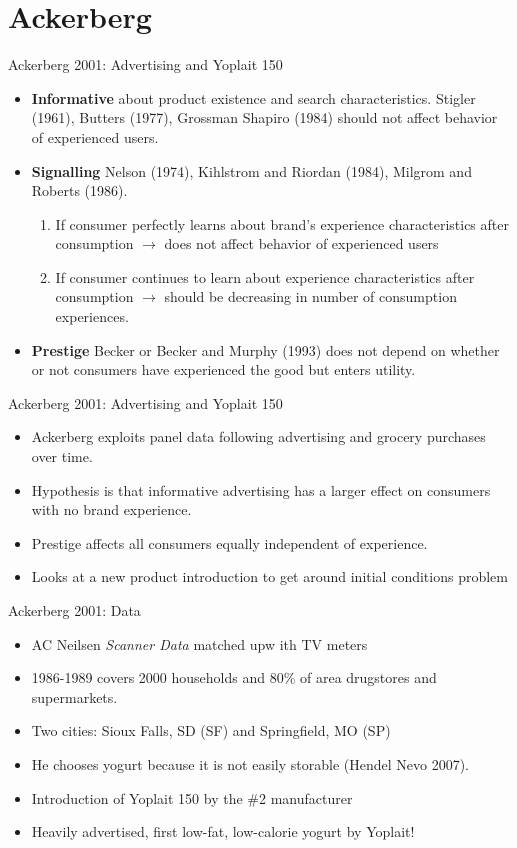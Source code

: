 \documentclass[aspectratio=169,11pt]{beamer}
\begin{document}
\section*{Ackerberg}
\begin{frame}{Ackerberg 2001: Advertising and Yoplait 150}
\begin{itemize}
\item \textbf{Informative} about product existence and search characteristics. Stigler (1961), Butters (1977), Grossman Shapiro (1984) should not affect behavior of experienced users.
\item \textbf{Signalling} Nelson (1974), Kihlstrom and Riordan (1984), Milgrom and Roberts (1986).
\begin{enumerate}
\item If consumer perfectly learns about brand's experience characteristics after consumption $\rightarrow$ does not affect behavior of experienced users
\item If consumer continues to learn about  experience characteristics after consumption $\rightarrow$ should be decreasing in number of consumption experiences.
\end{enumerate}
\item \textbf{Prestige} Becker or Becker and Murphy (1993) does not depend on whether or not consumers have experienced the good but enters utility.
\end{itemize}
\end{frame}

\begin{frame}{Ackerberg 2001: Advertising and Yoplait 150}
\begin{itemize}
\item Ackerberg exploits panel data following advertising and grocery purchases over time.
\item Hypothesis is that \alert{informative} advertising has a larger effect on consumers with no brand experience.
\item \alert{Prestige} affects all consumers equally independent of experience.
\item Looks at a new product introduction to get around \alert{initial conditions problem}
\end{itemize}
\end{frame}

\begin{frame}{Ackerberg 2001: Data}
\begin{itemize}
\item AC Neilsen \textit{Scanner Data} matched upw ith TV meters
\item 1986-1989 covers 2000 households and 80\% of area drugstores and supermarkets.
\item Two cities: Sioux Falls, SD \alert{(SF)} and Springfield, MO \alert{(SP)}
\item He chooses yogurt because it is not easily storable (Hendel Nevo 2007).
\item Introduction of \alert{Yoplait 150} by the \#2 manufacturer
\item Heavily advertised, first low-fat, low-calorie yogurt by Yoplait!
\end{itemize}
\end{frame}
\end{document}
